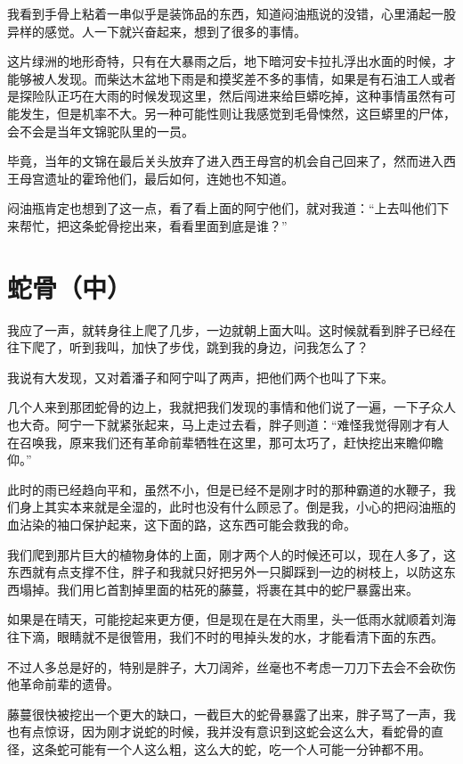 我看到手骨上粘着一串似乎是装饰品的东西，知道闷油瓶说的没错，心里涌起一股异样的感觉。人一下就兴奋起来，想到了很多的事情。

这片绿洲的地形奇特，只有在大暴雨之后，地下暗河安卡拉扎浮出水面的时候，才能够被人发现。而柴达木盆地下雨是和摸奖差不多的事情，如果是有石油工人或者是探险队正巧在大雨的时候发现这里，然后闯进来给巨蟒吃掉，这种事情虽然有可能发生，但是机率不大。另一种可能性则让我感觉到毛骨悚然，这巨蟒里的尸体，会不会是当年文锦驼队里的一员。

毕竟，当年的文锦在最后关头放弃了进入西王母宫的机会自己回来了，然而进入西王母宫遗址的霍玲他们，最后如何，连她也不知道。

闷油瓶肯定也想到了这一点，看了看上面的阿宁他们，就对我道：“上去叫他们下来帮忙，把这条蛇骨挖出来，看看里面到底是谁？”

\chapter{蛇骨（中）}

我应了一声，就转身往上爬了几步，一边就朝上面大叫。这时候就看到胖子已经在往下爬了，听到我叫，加快了步伐，跳到我的身边，问我怎么了？

我说有大发现，又对着潘子和阿宁叫了两声，把他们两个也叫了下来。

几个人来到那团蛇骨的边上，我就把我们发现的事情和他们说了一遍，一下子众人也大奇。阿宁一下就紧张起来，马上走过去看，胖子则道：“难怪我觉得刚才有人在召唤我，原来我们还有革命前辈牺牲在这里，那可太巧了，赶快挖出来瞻仰瞻仰。”

此时的雨已经趋向平和，虽然不小，但是已经不是刚才时的那种霸道的水鞭子，我们身上其实本来就是全湿的，此时也没有什么顾忌了。倒是我，小心的把闷油瓶的血沾染的袖口保护起来，这下面的路，这东西可能会救我的命。

我们爬到那片巨大的植物身体的上面，刚才两个人的时候还可以，现在人多了，这东西就有点支撑不住，胖子和我就只好把另外一只脚踩到一边的树枝上，以防这东西塌掉。我们用匕首割掉里面的枯死的藤蔓，将裹在其中的蛇尸暴露出来。

如果是在晴天，可能挖起来更方便，但是现在是在大雨里，头一低雨水就顺着刘海往下滴，眼睛就不是很管用，我们不时的甩掉头发的水，才能看清下面的东西。

不过人多总是好的，特别是胖子，大刀阔斧，丝毫也不考虑一刀刀下去会不会砍伤他革命前辈的遗骨。

藤蔓很快被挖出一个更大的缺口，一截巨大的蛇骨暴露了出来，胖子骂了一声，我也有点惊讶，因为刚才说蛇的时候，我并没有意识到这蛇会这么大，看蛇骨的直径，这条蛇可能有一个人这么粗，这么大的蛇，吃一个人可能一分钟都不用。

